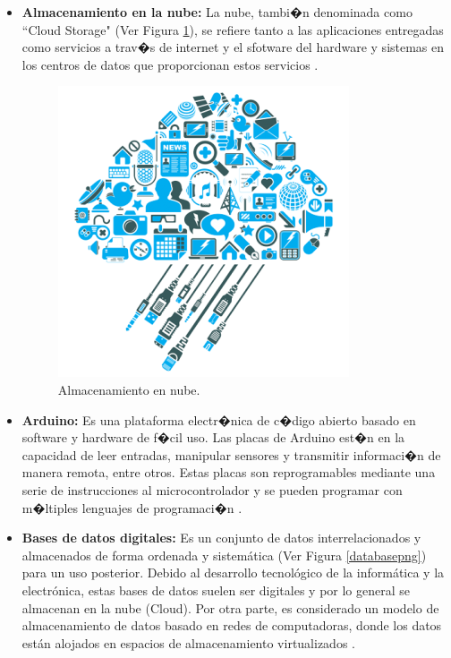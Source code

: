 \begin{itemize}
\begin{itemize}
	\item \textbf{Almacenamiento en la nube:}
	 La nube, tambi�n denominada como ``Cloud Storage" (Ver Figura \ref{cloudpng}), se refiere tanto a las aplicaciones entregadas como servicios a trav�s de internet y el sfotware del hardware y sistemas en los centros de datos que proporcionan estos servicios \cite{cloud2}.
	\begin{figure}[H]
	\begin{center}
		\includegraphics[scale=0.5]{img/cloud.png}
	\end{center}
	\caption{Almacenamiento en nube. \label{cloudpng}}
	\end{figure}
	\item \textbf{Arduino:} Es una plataforma electr�nica de c�digo abierto basado en software y hardware de f�cil uso. Las placas de Arduino est�n en la capacidad de leer entradas, manipular sensores y transmitir informaci�n de manera remota, entre otros. Estas placas son reprogramables mediante una serie de instrucciones al microcontrolador y se pueden programar con m�ltiples lenguajes de programaci�n \cite{arduinodef}.
	\item \textbf{Bases de datos digitales:}
	Es un conjunto de datos interrelacionados y almacenados de forma ordenada y sistem\'atica (Ver Figura \ref{databasepng}) para un uso posterior\cite{database}. Debido al desarrollo tecnol\'ogico de la inform\'atica y la electr\'onica, estas bases de datos suelen ser digitales y por lo general se almacenan en la nube (Cloud). Por otra parte, es considerado un modelo de almacenamiento de datos basado en redes de computadoras, donde los datos est\'an alojados en espacios de almacenamiento virtualizados \cite{cloud}.
	\begin{figure}[H]

\end{figure}
\end{itemize}
\end{itemize}

